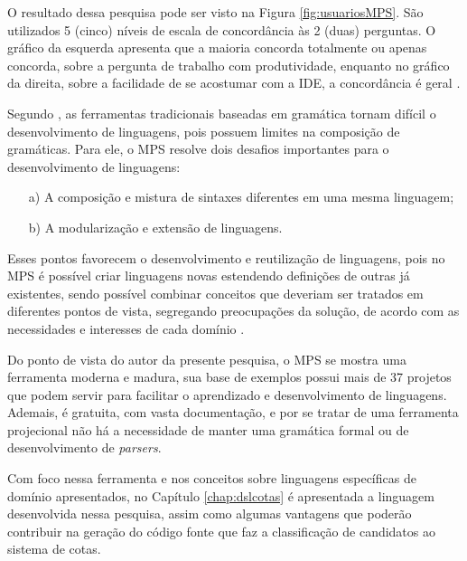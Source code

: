 O resultado dessa pesquisa pode ser visto na Figura \ref{fig:usuariosMPS}. São utilizados 5 (cinco) níveis de escala de concordância às 2 (duas) perguntas. O gráfico da esquerda apresenta que a maioria concorda totalmente ou apenas concorda, sobre a pergunta de trabalho com produtividade, enquanto no gráfico da direita, sobre a facilidade de se acostumar com a \gls{IDE}, a concordância é geral \cite{voelter2014generic}.



Segundo , as ferramentas tradicionais baseadas em gramática tornam difícil o desenvolvimento de linguagens, pois possuem limites na composição de gramáticas. Para ele, o \gls{MPS} resolve dois desafios importantes para o desenvolvimento de linguagens: 
\begin{enumerate}
    \item[a)] A composição e mistura de sintaxes diferentes em uma mesma linguagem;
    \item[b)] A modularização e extensão de linguagens.
\end{enumerate}

Esses pontos favorecem o desenvolvimento e reutilização de linguagens, pois no \gls{MPS} é possível criar linguagens novas estendendo definições de outras já existentes, sendo possível combinar conceitos que deveriam ser tratados em diferentes pontos de vista, segregando preocupações da solução, de acordo com as necessidades e interesses de cada domínio \cite{volter2011language}.

Do ponto de vista do autor da presente pesquisa, o \gls{MPS} se mostra uma ferramenta moderna e madura, sua base de exemplos possui mais de 37 projetos que podem servir para facilitar o aprendizado e desenvolvimento de linguagens. Ademais, é gratuita, com vasta documentação, e por se tratar de uma ferramenta projecional não há a necessidade de manter uma gramática formal ou de desenvolvimento de \textit{parsers}.

Com foco nessa ferramenta e nos conceitos sobre linguagens específicas de domínio apresentados, no Capítulo \ref{chap:dslcotas} é apresentada a linguagem desenvolvida nessa pesquisa, assim como algumas vantagens que poderão contribuir na geração do código fonte que faz a classificação de candidatos ao sistema de cotas.
